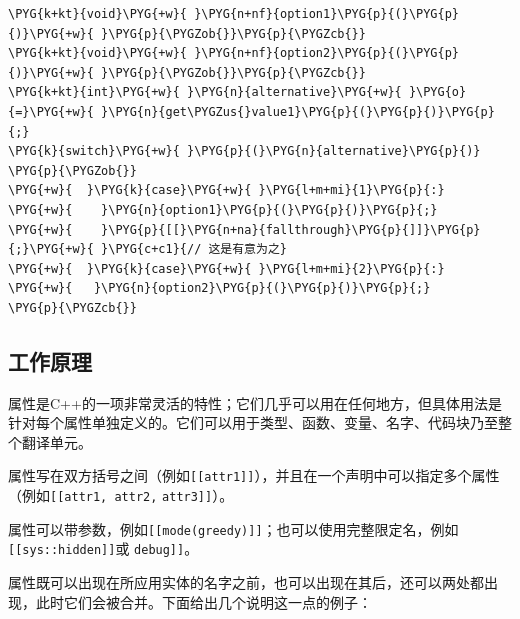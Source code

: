 \begin{itemize}

\begin{codeblockbg}
\begin{Verbatim}[commandchars=\\\{\},breaklines=true,breakanywhere=true,fontsize=\codefont,xleftmargin=17bp]
\PYG{k+kt}{void}\PYG{+w}{ }\PYG{n+nf}{option1}\PYG{p}{(}\PYG{p}{)}\PYG{+w}{ }\PYG{p}{\PYGZob{}}\PYG{p}{\PYGZcb{}}
\PYG{k+kt}{void}\PYG{+w}{ }\PYG{n+nf}{option2}\PYG{p}{(}\PYG{p}{)}\PYG{+w}{ }\PYG{p}{\PYGZob{}}\PYG{p}{\PYGZcb{}}
\PYG{k+kt}{int}\PYG{+w}{ }\PYG{n}{alternative}\PYG{+w}{ }\PYG{o}{=}\PYG{+w}{ }\PYG{n}{get\PYGZus{}value1}\PYG{p}{(}\PYG{p}{)}\PYG{p}{;}
\PYG{k}{switch}\PYG{+w}{ }\PYG{p}{(}\PYG{n}{alternative}\PYG{p}{)}
\PYG{p}{\PYGZob{}}
\PYG{+w}{  }\PYG{k}{case}\PYG{+w}{ }\PYG{l+m+mi}{1}\PYG{p}{:}
\PYG{+w}{    }\PYG{n}{option1}\PYG{p}{(}\PYG{p}{)}\PYG{p}{;}
\PYG{+w}{    }\PYG{p}{[[}\PYG{n+na}{fallthrough}\PYG{p}{]]}\PYG{p}{;}\PYG{+w}{ }\PYG{c+c1}{// 这是有意为之}
\PYG{+w}{  }\PYG{k}{case}\PYG{+w}{ }\PYG{l+m+mi}{2}\PYG{p}{:}
\PYG{+w}{   }\PYG{n}{option2}\PYG{p}{(}\PYG{p}{)}\PYG{p}{;}
\PYG{p}{\PYGZcb{}}
\end{Verbatim}
\end{codeblockbg}

\end{itemize}



\subsection{工作原理}



属性是C++的一项非常灵活的特性；它们几乎可以用在任何地方，但具体用法是针对每个属性单独定义的。它们可以用于类型、函数、变量、名字、代码块乃至整个翻译单元。



属性写在双方括号之间（例如\texttt{[[attr1]]}），并且在一个声明中可以指定多个属性（例如\texttt{[[attr1, attr2,} \texttt{attr3]]}）。



属性可以带参数，例如\texttt{[[mode(\allowbreak{}greedy)\allowbreak{}]]}；也可以使用完整限定名，例如\texttt{[[sys::\allowbreak{}hidden]]}或\myttbr{[[using sys: visibility(\allowbreak{}hidden)\allowbreak{},} \texttt{debug]]}。



属性既可以出现在所应用实体的名字之前，也可以出现在其后，还可以两处都出现，此时它们会被合并。下面给出几个说明这一点的例子：


